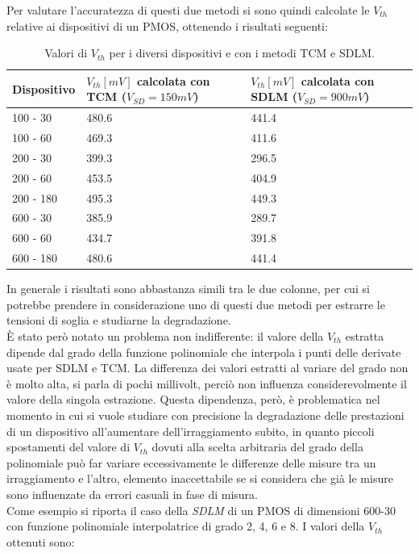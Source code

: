 \documentclass[12pt, letterpaper]{book}
\begin{document}
Per valutare l'accuratezza di questi due metodi si sono quindi calcolate le $V_{th}$ relative ai dispositivi di un PMOS, ottenendo i risultati seguenti:

\begin{table}[h!]
  \renewcommand{\arraystretch}{1.3}
  \centering
  \begin{tabular}{m{4.4 cm} m{4.4 cm} m{4.4 cm}}
    \toprule
    Dispositivo & $V_{th} [mV]$ calcolata con TCM ($V_{SD} = 150 mV$) & $V_{th} [mV]$ calcolata con SDLM ($V_{SD} = 900 mV$) \\
    \midrule
    100 - 30    & 480.6                              & 441.4                               \\
    \hline
    100 - 60    & 469.3                              & 411.6                               \\
    \hline
    200 - 30    & 399.3                              & 296.5                               \\
    \hline
    200 - 60    & 453.5                              & 404.9                               \\
    \hline
    200 - 180   & 495.3                              & 449.3                               \\
    \hline
    600 - 30    & 385.9                              & 289.7                               \\
    \hline
    600 - 60    & 434.7                              & 391.8                               \\
    \hline
    600 - 180   & 480.6                              & 441.4                               \\
    \bottomrule
  \end{tabular}
  \caption{Valori di $V_{th}$ per i diversi dispositivi e con i metodi TCM e SDLM.}
  \label{tab:Iz*}
\end{table}

In generale i risultati sono abbastanza simili tra le due colonne, per cui si potrebbe prendere in considerazione uno di questi due metodi  per estrarre le tensioni di soglia e studiarne la degradazione.\\
È stato però notato un problema non indifferente: il valore della $V_{th}$ estratta dipende dal grado della funzione polinomiale che interpola i punti delle derivate usate per SDLM e TCM. La differenza dei valori estratti al variare del grado non è molto alta, si parla di pochi millivolt, perciò non influenza considerevolmente il valore della singola estrazione. Questa dipendenza, però, è problematica nel momento in cui si vuole studiare con precisione la degradazione delle prestazioni di un dispositivo all'aumentare dell'irraggiamento subito, in quanto piccoli spostamenti del valore di $V_{th}$ dovuti alla scelta arbitraria del grado della polinomiale può far variare eccessivamente le differenze delle misure tra un irraggiamento e l'altro, elemento inaccettabile se si considera che già le misure sono influenzate da errori casuali in fase di misura.\\
Come esempio si riporta il caso della \emph{SDLM} di un PMOS di dimensioni 600-30 con funzione polinomiale interpolatrice di grado 2, 4, 6 e 8. I valori della $V_{th}$ ottenuti sono:
\end{document}
